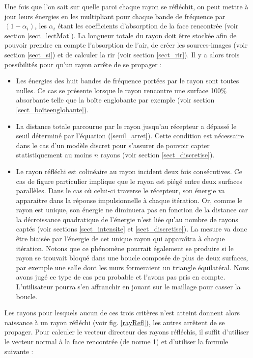 Une fois que l'on sait sur quelle paroi chaque rayon se réfléchit, on peut mettre à jour leurs énergies en les multipliant pour chaque bande de fréquence par $(1-\alpha_i)$, les $\alpha_i$ étant les coefficients d'absorption de la face rencontrée (voir section \ref{sect_lectMat}). La longueur totale du rayon doit être stockée afin de pouvoir prendre en compte l'absorption de l'air, de créer les sources-images (voir section \ref{sect_si}) et de calculer la \gls{rir}  (voir section \ref{sect_rir}). Il y a alors trois possibilités pour qu'un rayon arrête de se propager : 
\begin{itemize}
	\item Les énergies des huit bandes de fréquence portées par le rayon sont toutes nulles. Ce cas se présente lorsque le rayon rencontre une surface 100\% absorbante telle que la boîte englobante par exemple (voir section \ref{sect_boîteenglobante}).
	\item La distance totale parcourue par le rayon jusqu'au récepteur a dépassé le seuil déterminé par l'équation (\ref{seuil_arret}). Cette condition est nécessaire dans le cas d'un modèle discret pour s'assurer de pouvoir capter statistiquement au moins $n$ rayons (voir section \ref{sect_discretise}).
	\item Le rayon réfléchi est colinéaire au rayon incident deux fois consécutives. Ce cas de figure particulier implique que le rayon est piégé entre deux surfaces parallèles. Dans le cas où celui-ci traverse le récepteur, son énergie va apparaitre dans la réponse impulsionnelle à chaque itération. Or, comme le rayon est unique, son énergie ne diminuera pas en fonction de la distance car la décroissance quadratique de l'énergie n'est liée qu'au nombre de rayons captés (voir sections \ref{sect_intensite} et \ref{sect_discretise}). La mesure va donc être biaisée par l'énergie de cet unique rayon qui apparaîtra à chaque itération. Notons que ce phénomène pourrait également se produire si le rayon se trouvait bloqué dans une boucle composée de plus de deux surfaces, par exemple une salle dont les murs formeraient un triangle équilatéral. Nous avons jugé ce type de cas peu probable et l'avons pas pris en compte. L'utilisateur pourra s'en affranchir en jouant sur le maillage pour casser la boucle. 
\end{itemize}
%
Les rayons pour lesquels aucun de ces trois critères n'est atteint donnent alors naissance à un rayon réfléchi (voir fig. \ref{rayRefl}), les autres arrêtent de se propager. Pour calculer le vecteur directeur des rayons réfléchis, il suffit d'utiliser le vecteur normal à la face rencontrée (de norme 1) et d'utiliser la formule suivante :
